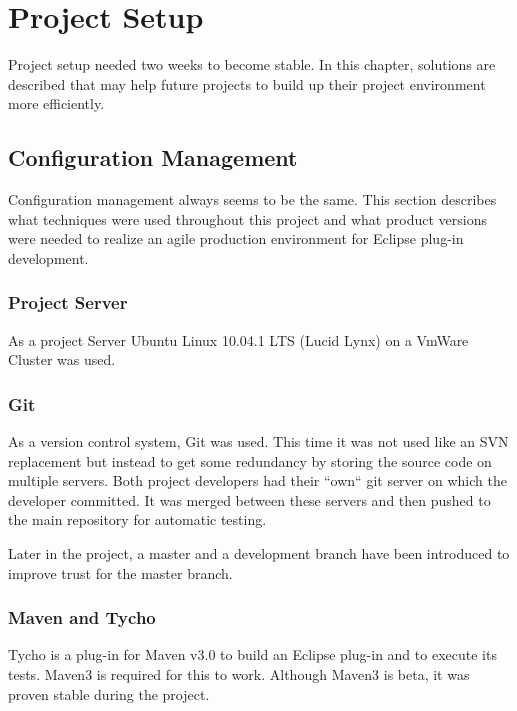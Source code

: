 \chapter{Project Setup}
\thispagestyle{fancy}

Project setup needed two weeks to become stable. In this chapter, solutions are 
described that may help future projects to build up their project environment 
more efficiently.

\section{Configuration Management}

Configuration management always seems to be the same. This section describes 
what techniques were used throughout this project and what product versions were 
needed to realize an agile production environment for Eclipse plug-in
development.

\subsection{Project Server}

As a project Server Ubuntu Linux 10.04.1 LTS (Lucid Lynx) on a VmWare Cluster
was used.

\subsection{Git}

As a version control system, Git\cite{GIT} was used. This time it was not used like an SVN
replacement but instead to get some redundancy by storing the source code on
multiple servers. Both project developers had their ``own`` git server on which
the developer committed. It was merged between these servers and then pushed to
the main repository for automatic testing.

Later in the project, a master and a development branch have been introduced to 
improve trust for the master branch.

\subsection{Maven and Tycho}

Tycho\cite{tycho} is a plug-in for Maven\cite{maven} v3.0 to build an Eclipse plug-in and to execute its tests.
Maven3 is required for this to work. Although Maven3 is beta, it was proven
stable during the project.

